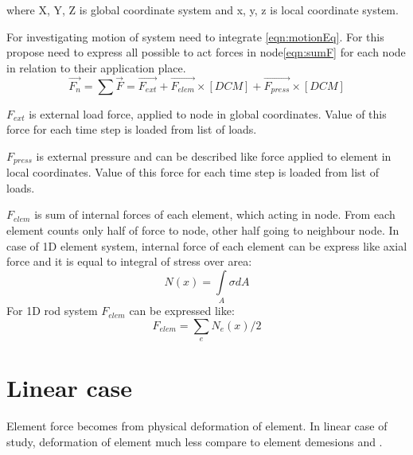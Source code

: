 \documentclass[12pt]{report}
\begin{document}
 where {X, Y, Z} is global coordinate system and {x, y, z} is local coordinate system.\par
For investigating motion of system need to integrate \eqref{eqn:motionEq}. For this propose need to express all possible 
to act forces in node\eqref{eqn:sumF} for each node in relation to their application place. 
\begin{equation}\label{eqn:sumF}
   \overrightarrow{F_n}=\sum\overrightarrow{F}=
   \overrightarrow{F_{ext}}+
   \overrightarrow{F_{elem}}\times[DCM]+
   \overrightarrow{F_{press}}\times[DCM]
\end{equation}\par
$F_{ext}$ is external load force, applied to node in global coordinates. Value of this force for each time step is loaded
from list of loads.\par
$F_{press}$ is external pressure and can be described like force applied to element in local coordinates. Value of this force
for each time step is loaded from list of loads. \par
$F_{elem}$ is sum of internal forces of each element, which acting in node. From each element counts only half of force to 
node, other half going to neighbour node. In case of 1D element system, internal force of each element can be express like
axial force and it is equal to integral of stress over area:
\begin{equation}\label{eqn:Nx}
  N(x)= \int\limits_A \sigma dA
\end{equation}
For 1D rod system $F_{elem}$ can be expressed like:
\begin{equation}\label{eqn:Felem}
  F_{elem}= \sum_{e}N_e(x)/2
\end{equation}\par
\section{Linear case}\par

Element force becomes from physical deformation of element. In linear case of study, deformation of element much less compare to
element demesions and .
\end{document}
